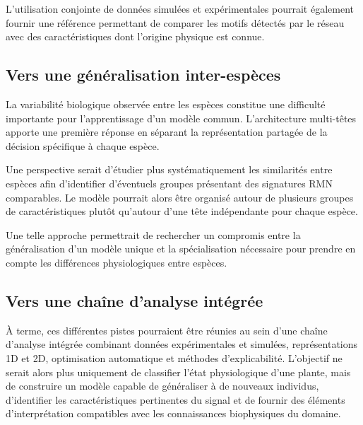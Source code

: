\documentclass[12pt,a4paper,twoside]{article}
\begin{document}
L'utilisation conjointe de données simulées et expérimentales pourrait
également fournir une référence permettant de comparer les motifs détectés par
le réseau avec des caractéristiques dont l'origine physique est connue.

\subsection{Vers une généralisation inter-espèces}

La variabilité biologique observée entre les espèces constitue une difficulté
importante pour l'apprentissage d'un modèle commun. L'architecture multi-têtes
apporte une première réponse en séparant la représentation partagée de la
décision spécifique à chaque espèce.

Une perspective serait d'étudier plus systématiquement les similarités entre
espèces afin d'identifier d'éventuels groupes présentant des signatures RMN
comparables. Le modèle pourrait alors être organisé autour de plusieurs groupes
de caractéristiques plutôt qu'autour d'une tête indépendante pour chaque
espèce.

Une telle approche permettrait de rechercher un compromis entre la
généralisation d'un modèle unique et la spécialisation nécessaire pour prendre
en compte les différences physiologiques entre espèces.

\subsection{Vers une chaîne d'analyse intégrée}

À terme, ces différentes pistes pourraient être réunies au sein d'une chaîne
d'analyse intégrée combinant données expérimentales et simulées, représentations
1D et 2D, optimisation automatique et méthodes d'explicabilité. L'objectif ne
serait alors plus uniquement de classifier l'état physiologique d'une plante,
mais de construire un modèle capable de généraliser à de nouveaux individus,
d'identifier les caractéristiques pertinentes du signal et de fournir des
éléments d'interprétation compatibles avec les connaissances biophysiques du
domaine.

\clearpage
\printbibliography[title={Bibliographie}]
\end{document}
